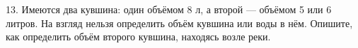 13. Имеются два кувшина: один объёмом 8 л, а второй --- объёмом 5 или 6 литров. На взгляд нельзя определить объём кувшина или воды в нём. Опишите, как определить объём второго кувшина, находясь возле реки.\\
